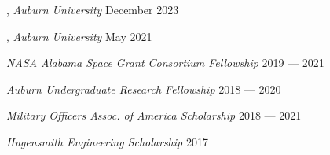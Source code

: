 
, \textit{Auburn University}	\hfill December 2023

, \textit{Auburn University} \hfill	May 2021

\textit{NASA Alabama Space Grant Consortium Fellowship} 	\hfill 2019 --- 2021

\textit{Auburn Undergraduate Research Fellowship} \hfill	2018 --- 2020

\textit{Military Officers Assoc. of America Scholarship} \hfill	2018 --- 2021

\textit{Hugensmith Engineering Scholarship} \hfill	2017




